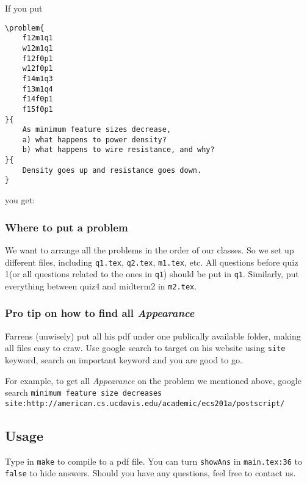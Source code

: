 If you put 
\begin{lstlisting}
\problem{
    f12m1q1
    w12m1q1
    f12f0p1
    w12f0p1
    f14m1q3
    f13m1q4
    f14f0p1
    f15f0p1
}{
    As minimum feature sizes decrease, 
    a) what happens to power density?
    b) what happens to wire resistance, and why?
}{
    Density goes up and resistance goes down.
}
\end{lstlisting}
you get:


\subsubsection*{Where to put a problem}

We want to arrange all the problems in the order of our classes.
So we set up different files, including \texttt{q1.tex}, \texttt{q2.tex}, \texttt{m1.tex}, etc.
All questions before quiz 1(or all questions related to the ones in \texttt{q1}) should be put in \texttt{q1}.
Similarly, put everything between quiz4 and midterm2 in \texttt{m2.tex}.

\subsubsection*{Pro tip on how to find all \textit{Appearance}}

Farrens (unwisely) put all his pdf under one publically available folder, making all files easy to craw.
Use google search to target on his website using \texttt{site} keyword, search on important keyword and you are good to go.

For example, to get all \textit{Appearance} on the problem we mentioned above, google search \texttt{minimum feature size decreases site:http://american.cs.ucdavis.edu/academic/ecs201a/postscript/}


\subsection*{Usage}

Type in \lstinline{make} to compile to a pdf file. 
You can turn \texttt{showAns} in \texttt{main.tex:36} to \texttt{false} to hide answers.
Should you have any questions, feel free to contact us.


